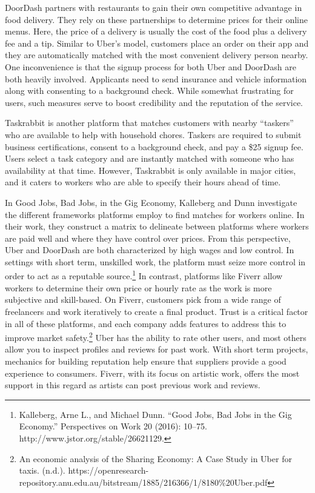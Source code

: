 DoorDash partners with restaurants to gain their own competitive advantage in food delivery. They rely on these partnerships to determine prices for their online menus. Here, the price of a delivery is usually the cost of the food plus a delivery fee and a tip. Similar to Uber’s model, customers place an order on their app and they are automatically matched with the most convenient delivery person nearby. One inconvenience is that the signup process for both Uber and DoorDash are both heavily involved. Applicants need to send insurance and vehicle information along with consenting to a background check. While somewhat frustrating for users, such measures serve to boost credibility and the reputation of the service. 

Taskrabbit is another platform that matches customers with nearby “taskers” who are available to help with household chores. Taskers are required to submit business certifications, consent to a background check, and pay a \$25 signup fee. Users select a task category and are instantly matched with someone who has availability at that time. However, Taskrabbit is only available in major cities, and it caters to workers who are able to specify their hours ahead of time. 

In Good Jobs, Bad Jobs, in the Gig Economy, Kalleberg and Dunn investigate the different frameworks platforms employ to find matches for workers online. In their work, they construct a matrix to delineate between platforms where workers are paid well and where they have control over prices. From this perspective, Uber and DoorDash are both characterized by high wages and low control. In settings with short term, unskilled work, the platform must seize more control in order to act as a reputable source.\footnote{Kalleberg, Arne L., and Michael Dunn. “Good Jobs, Bad Jobs in the Gig Economy.” Perspectives on Work 20 (2016): 10–75. http://www.jstor.org/stable/26621129.} In contrast, platforms like Fiverr allow workers to determine their own price or hourly rate as the work is more subjective and skill-based. On Fiverr, customers pick from a wide range of freelancers and work iteratively to create a final product. Trust is a critical factor in all of these platforms, and each company adds features to address this to improve market safety.\footnote{An economic analysis of the Sharing Economy: A Case Study in Uber for taxis. (n.d.). https://openresearch-repository.anu.edu.au/bitstream/1885/216366/1/8180\%20Uber.pdf } Uber has the ability to rate other users, and most others allow you to inspect profiles and reviews for past work. With short term projects, mechanics for building reputation help ensure that suppliers provide a good experience to consumers. Fiverr, with its focus on artistic work, offers the most support in this regard as artists can post previous work and reviews.

